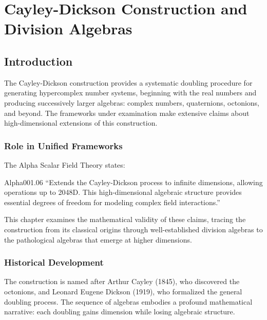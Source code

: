 
\chapter{Cayley-Dickson Construction and Division Algebras}
\label{ch:cayley_dickson}

\section{Introduction}

The Cayley-Dickson construction provides a systematic doubling procedure for generating hypercomplex number systems, beginning with the real numbers and producing successively larger algebras: complex numbers, quaternions, octonions, and beyond. The frameworks under examination make extensive claims about high-dimensional extensions of this construction.

\subsection{Role in Unified Frameworks}

The Alpha Scalar Field Theory states:

\begin{frameworkclaim}{Alpha001.06}
``Extends the Cayley-Dickson process to infinite dimensions, allowing operations up to 2048D. This high-dimensional algebraic structure provides essential degrees of freedom for modeling complex field interactions.''
\end{frameworkclaim}

This chapter examines the mathematical validity of these claims, tracing the construction from its classical origins through well-established division algebras to the pathological algebras that emerge at higher dimensions.

\subsection{Historical Development}

The construction is named after Arthur Cayley (1845), who discovered the octonions, and Leonard Eugene Dickson (1919), who formalized the general doubling process. The sequence of algebras embodies a profound mathematical narrative: each doubling gains dimension while losing algebraic structure.

